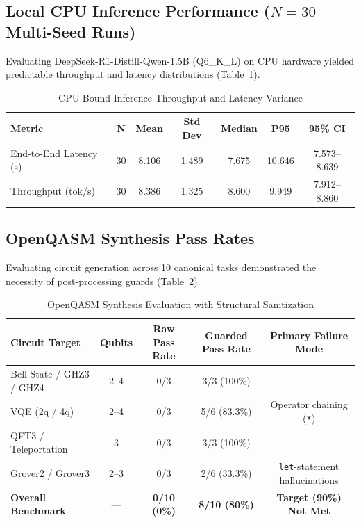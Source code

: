 \documentclass[journal]{IEEEtran}
\begin{document}
\subsection{Local CPU Inference Performance ($N=30$ Multi-Seed Runs)}
Evaluating DeepSeek-R1-Distill-Qwen-1.5B (Q6\_K\_L) on CPU hardware yielded
predictable throughput and latency distributions (Table~\ref{tab:inference}).

\begin{table}[!t]
\caption{CPU-Bound Inference Throughput and Latency Variance}
\begin{center}
\begin{tabular}{lcccccc}
\hline
Metric & N & Mean & Std Dev & Median & P95 & 95\% CI\\
\hline
End-to-End Latency (s) & 30 & 8.106 & 1.489 & 7.675 & 10.646 & 7.573--8.639\\
Throughput (tok/s) & 30 & 8.386 & 1.325 & 8.600 & 9.949 & 7.912--8.860\\
\hline
\end{tabular}
\end{center}
\label{tab:inference}
\end{table}

\subsection{OpenQASM Synthesis Pass Rates}
Evaluating circuit generation across 10 canonical tasks demonstrated the
necessity of post-processing guards (Table~\ref{tab:qasm}).

\begin{table}[!t]
\caption{OpenQASM Synthesis Evaluation with Structural Sanitization}
\begin{center}
\begin{tabular}{lcccc}
\hline
Circuit Target & Qubits & Raw Pass Rate & Guarded Pass Rate & Primary Failure Mode\\
\hline
Bell State / GHZ3 / GHZ4 & 2--4 & 0/3 & 3/3 (100\%) & ---\\
VQE (2q / 4q)            & 2--4 & 0/3 & 5/6 (83.3\%)   & Operator chaining (\texttt{*})\\
QFT3 / Teleportation     & 3    & 0/3 & 3/3 (100\%)   & ---\\
Grover2 / Grover3        & 2--3 & 0/3 & 2/6 (33.3\%)   & \texttt{let}-statement hallucinations\\
\hline
\textbf{Overall Benchmark} & --- & \textbf{0/10 (0\%)} & \textbf{8/10 (80\%)} & \textbf{Target (90\%) Not Met}\\
\hline
\end{tabular}
\end{center}
\label{tab:qasm}
\end{table}
\end{document}
